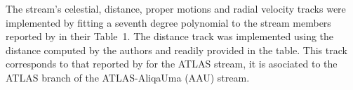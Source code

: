 The stream's celestial, distance, proper motions and radial velocity tracks were implemented by fitting a seventh degree polynomial to the stream members reported by \citet{Ibata2021} in their Table~1. The distance track was implemented using the distance computed by the authors and readily provided in the table. This track corresponds to that reported by \citet{Ibata2021} for the ATLAS stream, it is asociated to the ATLAS branch of the ATLAS-AliqaUma (AAU) stream.
